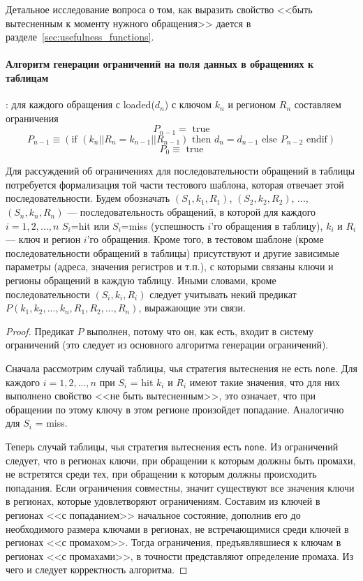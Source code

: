 Детальное исследование вопроса о том, как выразить свойство <<быть вытесненным к
моменту нужного обращения>> дается в разделе~\ref{sec:usefulness_functions}.

\paragraph{Алгоритм генерации ограничений на поля данных в обращениях к таблицам}:
для каждого обращения с loaded($d_n$) с ключом $k_n$ и регионом $R_n$ составляем ограничения
$$P_{n-1} = \mbox{~true}$$
$$P_{n-1} \equiv (\mbox{if~} (k_n||R_n = k_{n-1}||R_{n-1}) \mbox{~then~} d_n =
d_{n-1} \mbox{~else~} P_{n-2} \mbox{~endif})$$
$$P_0 \equiv \mbox{~true}$$

Для рассуждений об ограничениях для последовательности обращений в таблицы потребуется формализация той части тестового шаблона, которая отвечает этой последовательности. Будем обозначать $(S_1, k_1, R_1)$, $(S_2, k_2, R_2)$, ..., $(S_n, k_n, R_n)$ --- последовательность обращений, в которой для каждого $i = 1, 2, ..., n$ $S_i${=}hit или $S_i${=}miss (успешность $i$'го обращения в таблицу), $k_i$ и $R_i$ --- ключ и регион $i$'го обращения. Кроме того, в тестовом шаблоне (кроме последовательности обращений в таблицы) присутствуют и другие зависимые параметры (адреса, значения регистров и т.п.), с которыми связаны ключи и регионы обращений в каждую таблицу. Иными словами, кроме последовательности $(S_i, k_i, R_i)$ следует учитывать некий предикат $P(k_1, k_2, ..., k_n, R_1, R_2, ..., R_n)$, выражающие эти связи.

\begin{theorem}\label{mirror_correctness}
\CorrectnessMirror
\end{theorem}
\begin{proof}
  Предикат $P$ выполнен, потому что он, как есть, входит в систему ограничений (это следует из основного алгоритма генерации ограничений).

  Сначала рассмотрим случай таблицы, чья стратегия вытеснения не есть \texttt{none}. Для каждого $i = 1, 2, ..., n$ при $S_i$ = hit  $k_i$ и $R_i$ имеют такие значения, что для них выполнено свойство <<не быть вытесненным>>, это означает, что при обращении по этому ключу в этом регионе произойдет попадание. Аналогично для $S_i$ = miss.

  Теперь случай таблицы, чья стратегия вытеснения есть \texttt{none}. Из ограничений следует, что в регионах ключи, при обращении к которым должны быть промахи, не встретятся среди тех, при обращении к которым должны происходить попадания. Если ограничения совместны, значит существуют все значения ключи в регионах, которые удовлетворяют ограничениям. Составим из ключей в регионах <<с попаданием>> начальное состояние, дополнив его до необходимого размера ключами в регионах, не встречающимися среди ключей в регионах <<с промахом>>. Тогда ограничения, предъявлявшиеся к ключам в регионах <<с промахами>>, в точности представляют определение промаха. Из чего и следует корректность алгоритма.
\end{proof}

